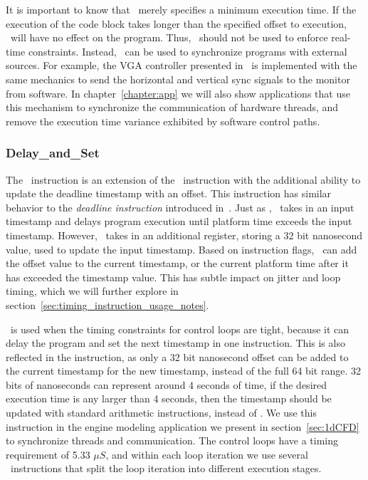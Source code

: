 It is important to know that \delayuntil\ merely specifies a minimum execution time.
If the execution of the code block takes longer than the specified offset to execution, \delayuntil\ will have no effect on the program.
Thus, \delayuntil\ should not be used to enforce real-time constraints.
Instead, \delayuntil\ can be used to synchronize programs with external sources. 
For example, the VGA controller presented in~\cite{ip2006processor} is implemented with the same mechanics to send the horizontal and vertical sync signals to the monitor from software.
In chapter~\ref{chapter:app} we will also show applications that use this mechanism to synchronize the communication of hardware threads, and remove the execution time variance exhibited by software control paths.  
    
\subsubsection{Delay\_and\_Set}
The \delayandset\ instruction is an extension of the \delayuntil\ instruction with the additional ability to update the deadline timestamp with an offset. 
This instruction has similar behavior to the \emph{deadline instruction} introduced in~\cite{ip2006processor}.
Just as \delayuntil, \delayandset\ takes in an input timestamp and delays program execution until platform time exceeds the input timestamp. 
However, \delayandset\ takes in an additional register, storing a 32 bit nanosecond value, used to update the input timestamp.
Based on instruction flags, \delayandset\ can add the offset value to the current timestamp, or the current platform time after it has exceeded the timestamp value. 
This has subtle impact on jitter and loop timing, which we will further explore in section~\ref{sec:timing_instruction_usage_notes}.  

\Delayandset\ is used when the timing constraints for control loops are tight, because it can delay the program and set the next timestamp in one instruction. 
This is also reflected in the instruction, as only a 32 bit nanosecond offset can be added to the current timestamp for the new timestamp, instead of the full 64 bit range. 
32 bits of nanoseconds can represent around 4 seconds of time, if the desired execution time is any larger than 4 seconds, then the timestamp should be updated with standard arithmetic instructions, instead of \delayandset.
We use this instruction in the engine modeling application we present in section~\ref{sec:1dCFD} to synchronize threads and communication. 
The control loops have a timing requirement of 5.33 $\mu S$, and within each loop iteration we use several \delayandset\ instructions that split the loop iteration into different execution stages. 


